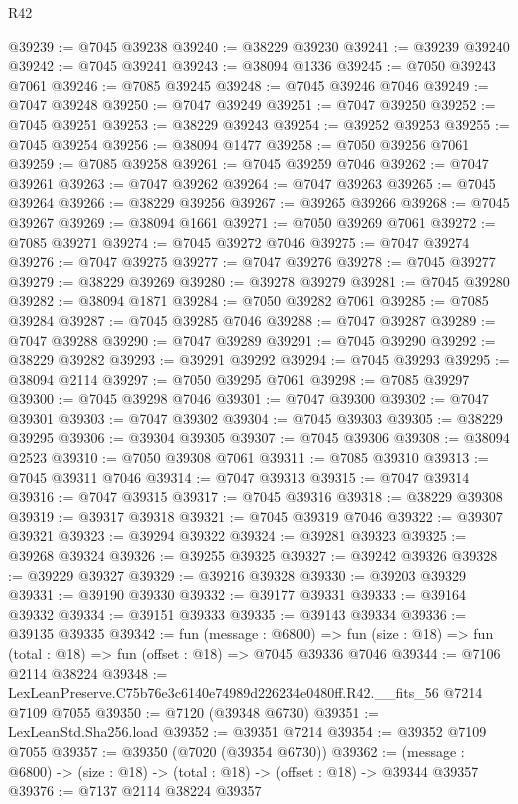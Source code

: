 \begin{lexlean}{R42}
\begin{coremodule}
{@39239 := @7045 @39238
@39240 := @38229 @39230
@39241 := @39239 @39240
@39242 := @7045 @39241
@39243 := @38094 @1336
@39245 := @7050 @39243 @7061
@39246 := @7085 @39245
@39248 := @7045 @39246 @7046
@39249 := @7047 @39248
@39250 := @7047 @39249
@39251 := @7047 @39250
@39252 := @7045 @39251
@39253 := @38229 @39243
@39254 := @39252 @39253
@39255 := @7045 @39254
@39256 := @38094 @1477
@39258 := @7050 @39256 @7061
@39259 := @7085 @39258
@39261 := @7045 @39259 @7046
@39262 := @7047 @39261
@39263 := @7047 @39262
@39264 := @7047 @39263
@39265 := @7045 @39264
@39266 := @38229 @39256
@39267 := @39265 @39266
@39268 := @7045 @39267
@39269 := @38094 @1661
@39271 := @7050 @39269 @7061
@39272 := @7085 @39271
@39274 := @7045 @39272 @7046
@39275 := @7047 @39274
@39276 := @7047 @39275
@39277 := @7047 @39276
@39278 := @7045 @39277
@39279 := @38229 @39269
@39280 := @39278 @39279
@39281 := @7045 @39280
@39282 := @38094 @1871
@39284 := @7050 @39282 @7061
@39285 := @7085 @39284
@39287 := @7045 @39285 @7046
@39288 := @7047 @39287
@39289 := @7047 @39288
@39290 := @7047 @39289
@39291 := @7045 @39290
@39292 := @38229 @39282
@39293 := @39291 @39292
@39294 := @7045 @39293
@39295 := @38094 @2114
@39297 := @7050 @39295 @7061
@39298 := @7085 @39297
@39300 := @7045 @39298 @7046
@39301 := @7047 @39300
@39302 := @7047 @39301
@39303 := @7047 @39302
@39304 := @7045 @39303
@39305 := @38229 @39295
@39306 := @39304 @39305
@39307 := @7045 @39306
@39308 := @38094 @2523
@39310 := @7050 @39308 @7061
@39311 := @7085 @39310
@39313 := @7045 @39311 @7046
@39314 := @7047 @39313
@39315 := @7047 @39314
@39316 := @7047 @39315
@39317 := @7045 @39316
@39318 := @38229 @39308
@39319 := @39317 @39318
@39321 := @7045 @39319 @7046
@39322 := @39307 @39321
@39323 := @39294 @39322
@39324 := @39281 @39323
@39325 := @39268 @39324
@39326 := @39255 @39325
@39327 := @39242 @39326
@39328 := @39229 @39327
@39329 := @39216 @39328
@39330 := @39203 @39329
@39331 := @39190 @39330
@39332 := @39177 @39331
@39333 := @39164 @39332
@39334 := @39151 @39333
@39335 := @39143 @39334
@39336 := @39135 @39335
@39342 := fun (message : @6800) =>
  fun (size : @18) => fun (total : @18) => fun (offset : @18) => @7045 @39336 @7046
@39344 := @7106 @2114 @38224
@39348 := LexLeanPreserve.C75b76e3c6140e74989d226234e0480ff.R42.__fits_56 @7214 @7109 @7055
@39350 := @7120 (@39348 @6730)
@39351 := LexLeanStd.Sha256.load
@39352 := @39351 @7214
@39354 := @39352 @7109 @7055
@39357 := @39350 (@7020 (@39354 @6730))
@39362 := (message : @6800) -> (size : @18) -> (total : @18) -> (offset : @18) -> @39344 @39357
@39376 := @7137
    @2114
    @38224
    @39357
}
\end{coremodule}
\end{lexlean}
